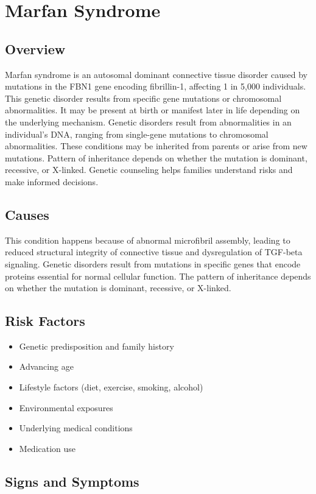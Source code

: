 \chapter{Marfan Syndrome}
\label{sec:Marfan Syndrome}

\section{Overview}
Marfan syndrome is an autosomal dominant connective tissue disorder caused by mutations in the FBN1 gene encoding fibrillin-1, affecting 1 in 5,000 individuals. This genetic disorder results from specific gene mutations or chromosomal abnormalities. It may be present at birth or manifest later in life depending on the underlying mechanism. Genetic disorders result from abnormalities in an individual's DNA, ranging from single-gene mutations to chromosomal abnormalities. These conditions may be inherited from parents or arise from new mutations. Pattern of inheritance depends on whether the mutation is dominant, recessive, or X-linked. Genetic counseling helps families understand risks and make informed decisions.
\section{Causes}
This condition happens because of abnormal microfibril assembly, leading to reduced structural integrity of connective tissue and dysregulation of TGF-beta signaling. Genetic disorders result from mutations in specific genes that encode proteins essential for normal cellular function. The pattern of inheritance depends on whether the mutation is dominant, recessive, or X-linked.   
\section{Risk Factors}

\begin{itemize}[noitemsep]
  \item Genetic predisposition and family history
  \item Advancing age
  \item Lifestyle factors (diet, exercise, smoking, alcohol)
  \item Environmental exposures
  \item Underlying medical conditions
  \item Medication use
\end{itemize}
\section{Signs and Symptoms}

